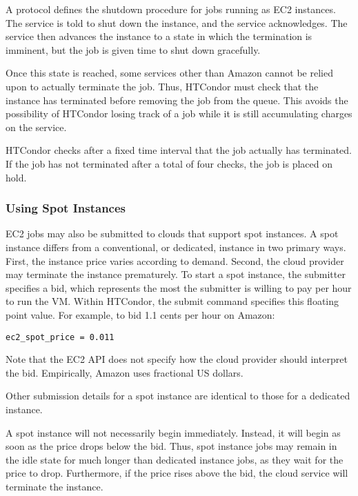 A protocol defines the shutdown procedure for jobs running as
EC2 instances.
The service is told to shut down the instance,
and the service acknowledges.
The service then advances the instance to a state in which
the termination is imminent, but the job is given time to
shut down gracefully.

Once this state is reached, some services other than Amazon cannot be
relied upon to actually terminate the job.
Thus, HTCondor must check that the instance has terminated
before removing the job from the queue.
This avoids the possibility of HTCondor losing track of a job
while it is still accumulating charges on the service.  

HTCondor checks after a fixed time interval
that the job actually has terminated.
If the job has not terminated after a total of four checks,
the job is placed on hold.

\subsubsection{\label{sec:spot-instances}Using Spot Instances}

EC2 jobs may also be submitted to clouds that support spot instances.
A spot instance differs from a conventional, or dedicated, instance in two
primary ways.
First, the instance price varies according to demand.
Second,
the cloud provider may terminate the instance prematurely.
To start a spot instance,
the submitter specifies a bid,
which represents the most the submitter is willing to pay per hour
to run the VM.
Within HTCondor, the submit command 
specifies this floating point value.
For example, 
to bid 1.1 cents per hour on Amazon:

\begin{verbatim}
ec2_spot_price = 0.011
\end{verbatim}

Note that the EC2 API does not specify how the cloud provider 
should interpret the bid.
Empirically, Amazon uses fractional US dollars.

Other submission details for a spot instance are identical to those
for a dedicated instance.

A spot instance will not necessarily begin immediately.
Instead, 
it will begin as soon as the price drops below the bid.
Thus, spot instance jobs
may remain in the idle state for much longer than dedicated instance jobs,
as they wait for the price to drop.
Furthermore, if the price rises above the bid, 
the cloud service will terminate the instance.

